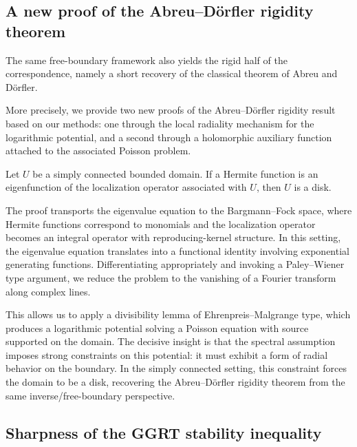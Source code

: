 \subsection{A new proof of the Abreu--D\"orfler rigidity theorem}

The same free-boundary framework also yields the rigid half of the correspondence, namely a short recovery of the classical theorem of Abreu and D\"orfler.

More precisely, we provide two new proofs of the Abreu--D\"orfler rigidity result based on our methods: one through the local radiality mechanism for the logarithmic potential, and a second through a holomorphic auxiliary function attached to the associated Poisson problem.

\begin{theorem}\label{thm:eig-loc-U}
Let $U$ be a simply connected bounded domain. If a Hermite function is an eigenfunction of the localization operator associated with $U$, then $U$ is a disk.
\end{theorem}

The proof transports the eigenvalue equation to the Bargmann--Fock space, where Hermite functions correspond to monomials and the localization operator becomes an integral operator with reproducing-kernel structure. In this setting, the eigenvalue equation translates into a functional identity involving exponential generating functions. Differentiating appropriately and invoking a Paley--Wiener type argument, we reduce the problem to the vanishing of a Fourier transform along complex lines.

This allows us to apply a divisibility lemma of Ehrenpreis--Malgrange type, which produces a logarithmic potential solving a Poisson equation with source supported on the domain. The decisive insight is that the spectral assumption imposes strong constraints on this potential: it must exhibit a form of radial behavior on the boundary. In the simply connected setting, this constraint forces the domain to be a disk, recovering the Abreu--D\"orfler rigidity theorem from the same inverse/free-boundary perspective.

\subsection{Sharpness of the GGRT stability inequality}

